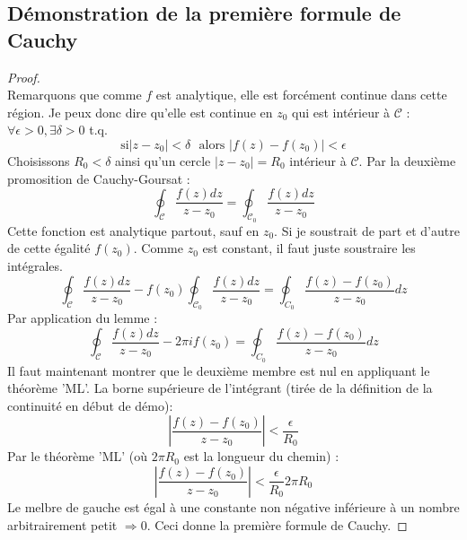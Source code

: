     \subsection{Démonstration de la première formule de Cauchy}
    \begin{proof}\ \\
    Remarquons que comme $f$ est analytique, elle est forcément continue dans cette région. Je 
    peux donc dire qu'elle est continue en $z_0$ qui est intérieur à $\mathcal{C}$ : $\forall
    \epsilon > 0, \exists \delta > 0$ t.q. 
    \begin{equation}
    \text{si} |z-z_0| < \delta\ \ \ \text{alors } |f(z)-f(z_0)| < \epsilon
    \end{equation}
    Choisissons $R_0 < \delta$ ainsi qu'un cercle $|z-z_0| = R_0$ intérieur à $\mathcal{C}$. Par
    la deuxième promosition de Cauchy-Goursat :
    \begin{equation}
    \oint_\mathcal{C} \dfrac{f(z) dz}{z-z_0} = \oint_\mathcal{C_0} \dfrac{f(z) dz}{z-z_0}
    \end{equation}
    Cette fonction est analytique partout, sauf en $z_0$. Si je soustrait de part et d'autre 
    de cette égalité $f(z_0)$. Comme $z_0$ est constant, il faut juste soustraire les intégrales.
    \begin{equation}
    \oint_\mathcal{C} \dfrac{f(z) dz}{z-z_0} -f(z_0)\oint_\mathcal{C_0} \dfrac{f(z) dz}{z-z_0} 
    = \oint_{C_0} \dfrac{f(z)-f(z_0)}{z-z_0}dz
    \end{equation}
    Par application du lemme :
    \begin{equation}
    \oint_\mathcal{C} \dfrac{f(z) dz}{z-z_0} - 2\pi i f(z_0) 
    = \oint_{C_0} \dfrac{f(z)-f(z_0)}{z-z_0}dz
    \end{equation}
    Il faut maintenant montrer que le deuxième membre est nul en appliquant le théorème 'ML'. La
    borne supérieure de l'intégrant (tirée de la définition de la continuité en début de démo):
    \begin{equation}
    \left|\dfrac{f(z) - f(z_0)}{z-z_0}\right| < \dfrac{\epsilon}{R_0}
    \end{equation}
    Par le théorème 'ML' (où $2\pi R_0$ est la longueur du chemin) :
    \begin{equation}
    \left|\dfrac{f(z) - f(z_0)}{z-z_0}\right| < \dfrac{\epsilon}{R_0}2\pi R_0
    \end{equation}
    Le melbre de gauche est égal à une constante non négative inférieure à un nombre arbitrairement
    petit $\Rightarrow 0$. Ceci donne la première formule de Cauchy.
    \end{proof}
    

